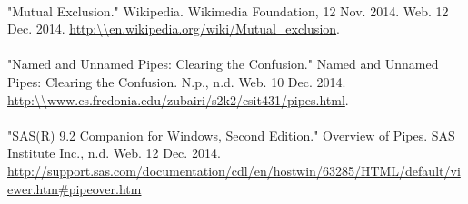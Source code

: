 \documentclass[a4paper]{article}
\begin{document}
\\
"Mutual Exclusion." Wikipedia. Wikimedia Foundation, 12 Nov. 2014. Web. 12 Dec. 2014. \url{http:\\en.wikipedia.org/wiki/Mutual_exclusion}.\\
\\
"Named and Unnamed Pipes: Clearing the Confusion." Named and Unnamed Pipes: Clearing the Confusion. N.p., n.d. Web. 10 Dec. 2014. \url{http:\\www.cs.fredonia.edu/zubairi/s2k2/csit431/pipes.html}.\\
\\
"SAS(R) 9.2 Companion for Windows, Second Edition." Overview of Pipes. SAS Institute Inc., n.d. Web. 12 Dec. 2014. \url{http://support.sas.com/documentation/cdl/en/hostwin/63285/HTML/default/viewer.htm#pipeover.htm}\\
\\ 
\end{document}
